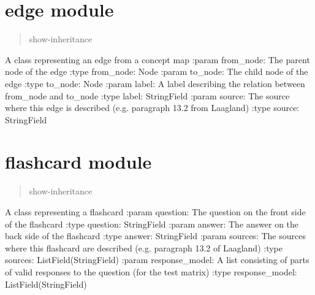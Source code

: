 \documentclass[letterpaper,10pt,english]{sphinxmanual}
\begin{document}
\chapter{edge module}
\label{\detokenize{edge:module-edge}}\label{\detokenize{edge::doc}}\label{\detokenize{edge:edge-module}}\begin{quote}\begin{description}
\item[{show-inheritance}] \leavevmode
\end{description}\end{quote}

\begin{fulllineitems}
\label{\detokenize{edge:edge.Edge}}
A class representing an edge from a concept map
:param from\_node: The parent node of the edge
:type from\_node: Node
:param to\_node: The child node of the edge
:type to\_node: Node
:param label: A label describing the relation between from\_node and to\_node
:type label: StringField
:param source: The source where this edge is described (e.g. paragraph 13.2 from Laagland)
:type source: StringField

\end{fulllineitems}



\chapter{flashcard module}
\label{\detokenize{flashcard:flashcard-module}}\label{\detokenize{flashcard:module-flashcard}}\label{\detokenize{flashcard::doc}}\begin{quote}\begin{description}
\item[{show-inheritance}] \leavevmode
\end{description}\end{quote}

\begin{fulllineitems}
\label{\detokenize{flashcard:flashcard.Flashcard}}
A class representing a flashcard
:param question: The question on the front side of the flashcard
:type question: StringField
:param answer: The answer on the back side of the flashcard
:type answer: StringField
:param sources: The sources where this flashcard are described (e.g. paragraph 13.2 of Laagland)
:type sources: ListField(StringField)
:param response\_model: A list consisting of parts of valid responses to the question (for the test matrix)
:type response\_model: ListField(StringField)

\end{fulllineitems}
\end{document}
